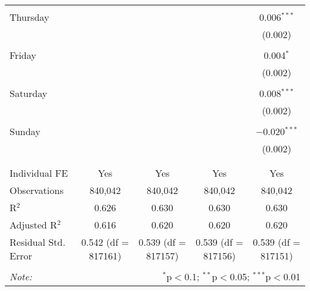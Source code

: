 \documentclass[
]{article}
\begin{document}
\begin{table}[!htbp]
{\begin{tabular}{@{\extracolsep{5pt}}lcccc}
  & & & & \\ 
 Thursday &  &  &  & 0.006$^{***}$ \\ 
  &  &  &  & (0.002) \\ 
  & & & & \\ 
 Friday &  &  &  & 0.004$^{*}$ \\ 
  &  &  &  & (0.002) \\ 
  & & & & \\ 
 Saturday &  &  &  & 0.008$^{***}$ \\ 
  &  &  &  & (0.002) \\ 
  & & & & \\ 
 Sunday &  &  &  & $-$0.020$^{***}$ \\ 
  &  &  &  & (0.002) \\ 
  & & & & \\ 
\hline \\[-1.8ex] 
Individual FE & Yes & Yes & Yes & Yes \\ 
Observations & 840,042 & 840,042 & 840,042 & 840,042 \\ 
R$^{2}$ & 0.626 & 0.630 & 0.630 & 0.630 \\ 
Adjusted R$^{2}$ & 0.616 & 0.620 & 0.620 & 0.620 \\ 
Residual Std. Error & 0.542 (df = 817161) & 0.539 (df = 817157) & 0.539 (df = 817156) & 0.539 (df = 817151) \\ 
\hline 
\hline \\[-1.8ex] 
\textit{Note:}  & \multicolumn{4}{r}{$^{*}$p$<$0.1; $^{**}$p$<$0.05; $^{***}$p$<$0.01} \\ 
\end{tabular}
} 
\end{table} 
\newpage
\end{document}

